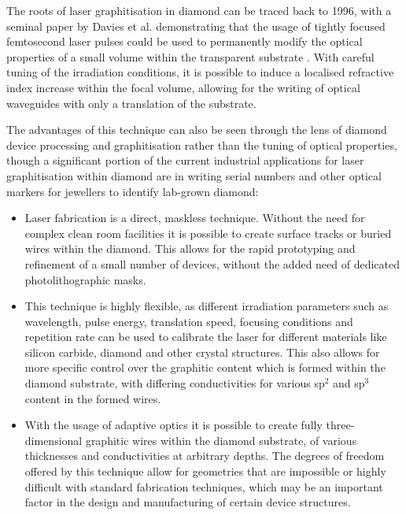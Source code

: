 The roots of laser graphitisation in diamond can be traced back to 1996, with a seminal paper by Davies et al. demonstrating that the usage of tightly focused femtosecond laser pulses could be used to permanently modify the optical properties of a small volume within the transparent substrate \cite{davies:1996}. With careful tuning of the irradiation conditions, it is possible to induce a localised refractive index increase within the focal volume, allowing for the writing of optical waveguides with only a translation of the substrate. 

The advantages of this technique can also be seen through the lens of diamond device processing and graphitisation rather than the tuning of optical properties, though a significant portion of the current industrial applications for laser graphitisation within diamond are in writing serial numbers and other optical markers for jewellers to identify lab-grown diamond:

\begin{itemize}
	\item Laser fabrication is a direct, maskless technique. Without the need for complex clean room facilities it is possible to create surface tracks or buried wires within the diamond. This allows for the rapid prototyping and refinement of a small number of devices, without the added need of dedicated photolithographic masks.
	\item This technique is highly flexible, as different irradiation parameters such as wavelength, pulse energy, translation speed, focusing conditions and repetition rate can be used to calibrate the laser for different materials like silicon carbide, diamond and other crystal structures. This also allows for more specific control over the graphitic content which is formed within the diamond substrate, with differing conductivities for various sp$^{2}$ and sp$^{3}$ content in the formed wires.
	\item With the usage of adaptive optics it is possible to create fully three-dimensional graphitic wires within the diamond substrate, of various thicknesses and conductivities at arbitrary depths. The degrees of freedom offered by this technique allow for geometries that are impossible or highly difficult with standard fabrication techniques, which may be an important factor in the design and manufacturing of certain device structures. 
\end{itemize}

\clearpage

